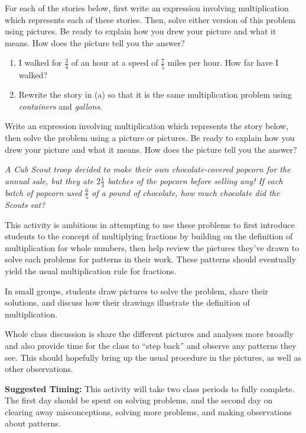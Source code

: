 \documentclass{ximera}
\begin{document}
\begin{problem}
 For each of the stories below, first write an expression involving multiplication which represents each of these stories.  Then, solve either version of this problem using pictures.  Be ready to explain how you drew your picture and what it means.  How does the picture tell you the answer? 

\begin{enumerate}
    \item I walked for  $\frac{3}{4}$ of an hour at a speed of  $\frac{7}{5}$ miles per hour.  How far have I walked?
    \item Rewrite the story in (a) so that it is the same multiplication problem using \emph{containers} and \emph{gallons}.
\end{enumerate}
\end{problem}
\vfill

\begin{problem}
 Write an expression involving multiplication which represents the story below, then solve the problem using a picture or pictures.  Be ready to explain how you drew your picture and what it means.  How does the picture tell you the answer?


\emph{A Cub Scout troop decided to make their own chocolate-covered popcorn for the annual sale, but they ate $2 \frac{1}{3}$ batches of the popcorn before selling any! If each batch of popcorn used $\frac{6}{5}$ of a pound of chocolate, how much chocolate did the Scouts eat?}

\end{problem}
\vfill
 
\newpage
\begin{instructorNotes}
This activity is ambitious in attempting to use these problems to first introduce students to the concept of multiplying fractions by building on the definition of multiplication for whole numbers, then help review the pictures they've drawn to solve each problems for patterns in their work.  These patterns should eventually yield the usual multiplication rule for fractions.  

In small groups, students draw pictures to solve the problem, share their solutions, and discuss how their drawings illustrate the definition of multiplication.  

Whole class discussion is share the different pictures and analyses more broadly and also provide time for the class to ``step back''    and observe any patterns they see.  This should hopefully bring up the usual procedure in the pictures, as well as other observations.

{\bf Suggested Timing:} This activity will take two class periods to fully complete.  The first day should be spent on solving problems, and the second day on clearing away misconceptions, solving more problems, and making observations about patterns.
\end{instructorNotes}
\end{document}
